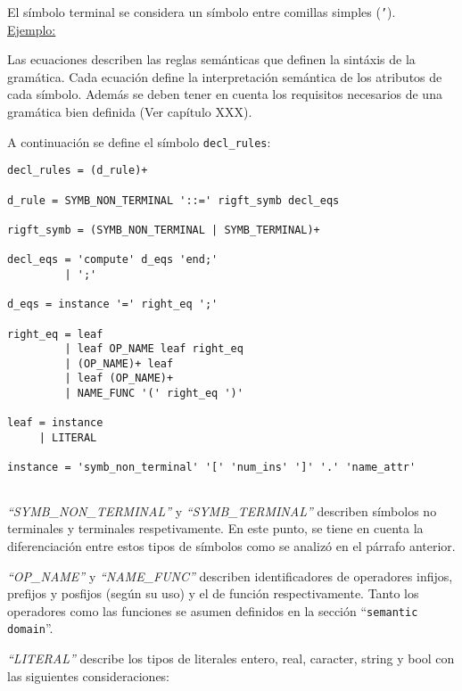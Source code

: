 El símbolo terminal se considera un símbolo entre comillas simples (\texttt{'}).\\ 

\underline{Ejemplo:}\ \\
\vspace{0.2cm}

Las ecuaciones describen las reglas semánticas que definen la sintáxis de la gramática. Cada ecuación define la interpretación semántica de los atributos de cada símbolo. Además se deben tener en cuenta los requisitos necesarios de una gramática bien definida (Ver capítulo XXX).

A continuación se define el símbolo \texttt{decl\_rules}:

\begin{center}
\lstset{language=inform}
\begin{lstlisting}
decl_rules = (d_rule)+ 

d_rule = SYMB_NON_TERMINAL '::=' rigft_symb decl_eqs

rigft_symb = (SYMB_NON_TERMINAL | SYMB_TERMINAL)+

decl_eqs = 'compute' d_eqs 'end;'
         | ';'

d_eqs = instance '=' right_eq ';'

right_eq = leaf
         | leaf OP_NAME leaf right_eq
         | (OP_NAME)+ leaf
         | leaf (OP_NAME)+
         | NAME_FUNC '(' right_eq ')' 

leaf = instance
     | LITERAL

instance = 'symb_non_terminal' '[' 'num_ins' ']' '.' 'name_attr'
            
\end{lstlisting}
\end{center}

\textit{``SYMB\_NON\_TERMINAL''} y \textit{``SYMB\_TERMINAL''} describen símbolos no terminales y terminales respetivamente. En este punto, se tiene en cuenta la diferenciación entre estos tipos de símbolos como se analizó en el párrafo anterior.
 
\textit{``OP\_NAME''} y  \textit{``NAME\_FUNC''} describen identificadores de operadores infijos, prefijos y posfijos (según su uso) y el de función respectivamente. Tanto los operadores como las funciones se asumen definidos en la sección ``\texttt{semantic domain}''.

\textit{``LITERAL''} describe los tipos de literales entero, real, caracter, string y bool con las siguientes consideraciones:


